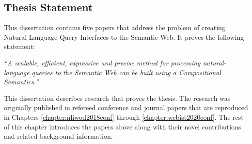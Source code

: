 \documentclass[../main.tex]{subfiles}
\begin{document}
\begin{refsection}

%









\section{Thesis Statement}

This dissertation contains five papers that address the problem of creating Natural Language Query Interfaces to the Semantic Web.  It proves the following statement:

\vspace{0.5em}

\textit{``A scalable, efficient, expressive and precise method for processing natural-language queries to the Semantic Web can be built using a Compositional Semantics.''}

\vspace{0.5em}

This dissertation describes research that proves the thesis. The research was originally published in refereed conference and journal papers that are reproduced in Chapters \ref{chapter:nliwod2018conf} through \ref{chapter:webist2020conf}. The rest of this chapter introduces the papers above along with their novel contributions and related background information.


\end{refsection}
\end{document}
